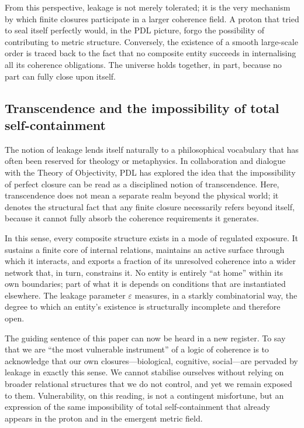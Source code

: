 \documentclass[11pt,a4paper]{article}
\theoremstyle{definition}
\begin{document}
From this perspective, leakage is not merely tolerated; it is the very mechanism by which finite closures participate in a larger coherence field. A proton that tried to seal itself perfectly would, in the PDL picture, forgo the possibility of contributing to metric structure. Conversely, the existence of a smooth large-scale order is traced back to the fact that no composite entity succeeds in internalising all its coherence obligations.\cite{Laubscher_UniversalCoherenceLeakage_2024,Laubscher_PDL_Position_2024} The universe holds together, in part, because no part can fully close upon itself.

\subsection{Transcendence and the impossibility of total self-containment}

The notion of leakage lends itself naturally to a philosophical vocabulary that has often been reserved for theology or metaphysics. In collaboration and dialogue with the Theory of Objectivity, PDL has explored the idea that the impossibility of perfect closure can be read as a disciplined notion of transcendence.\cite{Laubscher_PDL_TO_Dialogue_2024,Laubscher_Existence_PulsatingClosure_2026} Here, transcendence does not mean a separate realm beyond the physical world; it denotes the structural fact that any finite closure necessarily refers beyond itself, because it cannot fully absorb the coherence requirements it generates.

In this sense, every composite structure exists in a mode of regulated exposure. It sustains a finite core of internal relations, maintains an active surface through which it interacts, and exports a fraction of its unresolved coherence into a wider network that, in turn, constrains it.\cite{Laubscher_ProtonArch_v2_2024,Laubscher_UniversalCoherenceLeakage_2024} No entity is entirely ``at home'' within its own boundaries; part of what it is depends on conditions that are instantiated elsewhere. The leakage parameter \(\varepsilon\) measures, in a starkly combinatorial way, the degree to which an entity’s existence is structurally incomplete and therefore open.

The guiding sentence of this paper can now be heard in a new register. To say that we are ``the most vulnerable instrument'' of a logic of coherence is to acknowledge that our own closures---biological, cognitive, social---are pervaded by leakage in exactly this sense.\cite{Laubscher_Existence_PulsatingClosure_2026} We cannot stabilise ourselves without relying on broader relational structures that we do not control, and yet we remain exposed to them. Vulnerability, on this reading, is not a contingent misfortune, but an expression of the same impossibility of total self-containment that already appears in the proton and in the emergent metric field. 
\end{document}
